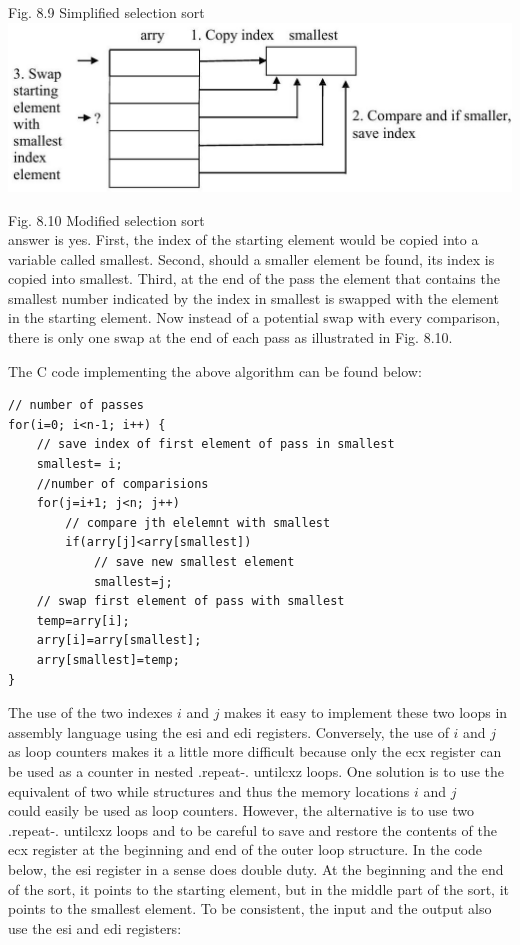 \documentclass[10pt]{article}
\begin{document}
Fig. 8.9 Simplified selection sort\\
\includegraphics[max width=\textwidth, center]{2025_03_24_ebe50cc223a6fbc49eecg-194}

Fig. 8.10 Modified selection sort\\
answer is yes. First, the index of the starting element would be copied into a variable called smallest. Second, should a smaller element be found, its index is copied into smallest. Third, at the end of the pass the element that contains the smallest number indicated by the index in smallest is swapped with the element in the starting element. Now instead of a potential swap with every comparison, there is only one swap at the end of each pass as illustrated in Fig. 8.10.

The C code implementing the above algorithm can be found below:

\begin{verbatim}
// number of passes
for(i=0; i<n-1; i++) {
    // save index of first element of pass in smallest
    smallest= i;
    //number of comparisions
    for(j=i+1; j<n; j++)
        // compare jth elelemnt with smallest
        if(arry[j]<arry[smallest])
            // save new smallest element
            smallest=j;
    // swap first element of pass with smallest
    temp=arry[i];
    arry[i]=arry[smallest];
    arry[smallest]=temp;
}
\end{verbatim}

The use of the two indexes $i$ and $j$ makes it easy to implement these two loops in assembly language using the esi and edi registers. Conversely, the use of $i$ and $j$ as loop counters makes it a little more difficult because only the ecx register can be used as a counter in nested .repeat-. untilcxz loops. One solution is to use the equivalent of two while structures and thus the memory locations $i$ and $j$\\
could easily be used as loop counters. However, the alternative is to use two .repeat-. untilcxz loops and to be careful to save and restore the contents of the ecx register at the beginning and end of the outer loop structure. In the code below, the esi register in a sense does double duty. At the beginning and the end of the sort, it points to the starting element, but in the middle part of the sort, it points to the smallest element. To be consistent, the input and the output also use the esi and edi registers:
\end{document}
